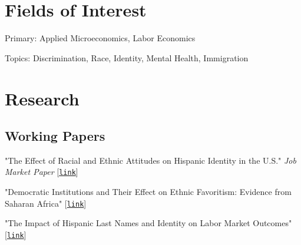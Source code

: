 \documentclass[10pt,letterpaper]{article}
\renewenvironment{itemize}{
  \begin{list}{}{
    \setlength{\leftmargin}{1.5em}
  }
}{
  \end{list}
}
\begin{document}
\section*{Fields of Interest}

Primary: Applied Microeconomics, Labor Economics

Topics: Discrimination, Race, Identity, Mental Health, Immigration

\section*{Research}
%
\subsection*{Working Papers}
\begin{itemize}

\item "The Effect of Racial and Ethnic Attitudes on Hispanic Identity in the U.S." \emph{Job Market Paper} [\href{https://hussainhadah.com/pdf/Hadah_JMP.pdf}{\tt link}]
\item "Democratic Institutions and Their Effect on Ethnic Favoritism: Evidence from Saharan Africa" [\href{https://hussainhadah.com/pdf/HussainHadahEthFav.pdf}{\tt link}]
\item "The Impact of Hispanic Last Names and Identity on Labor Market Outcomes" [\href{https://hussainhadah.com/pdf/FinalDraft.pdf}{\tt link}]

\end{itemize}
\end{document}
